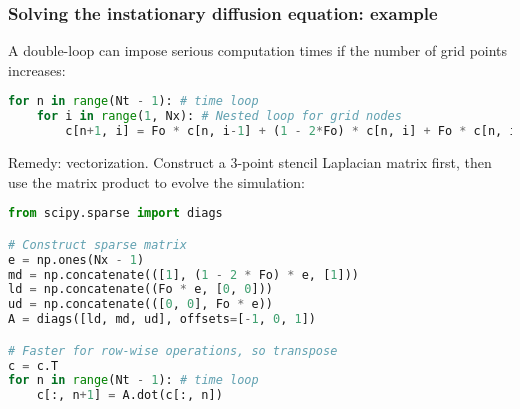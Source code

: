 \begin{frame}[fragile]
  \frametitle{Solving the instationary diffusion equation: example}
  A double-loop can impose serious computation times if the number of grid points increases:
  \begin{lstlisting}[language=Python,basicstyle=\scriptsize\ttfamily]
for n in range(Nt - 1): # time loop
    for i in range(1, Nx): # Nested loop for grid nodes
        c[n+1, i] = Fo * c[n, i-1] + (1 - 2*Fo) * c[n, i] + Fo * c[n, i+1]
\end{lstlisting}
Remedy: vectorization. Construct a 3-point stencil Laplacian matrix first, then use the matrix product to evolve the simulation:
\begin{lstlisting}[language=Python,basicstyle=\scriptsize\ttfamily]
from scipy.sparse import diags

# Construct sparse matrix
e = np.ones(Nx - 1)
md = np.concatenate(([1], (1 - 2 * Fo) * e, [1]))
ld = np.concatenate((Fo * e, [0, 0]))
ud = np.concatenate(([0, 0], Fo * e))
A = diags([ld, md, ud], offsets=[-1, 0, 1])

# Faster for row-wise operations, so transpose
c = c.T
for n in range(Nt - 1): # time loop
    c[:, n+1] = A.dot(c[:, n])
\end{lstlisting}
\end{frame}


